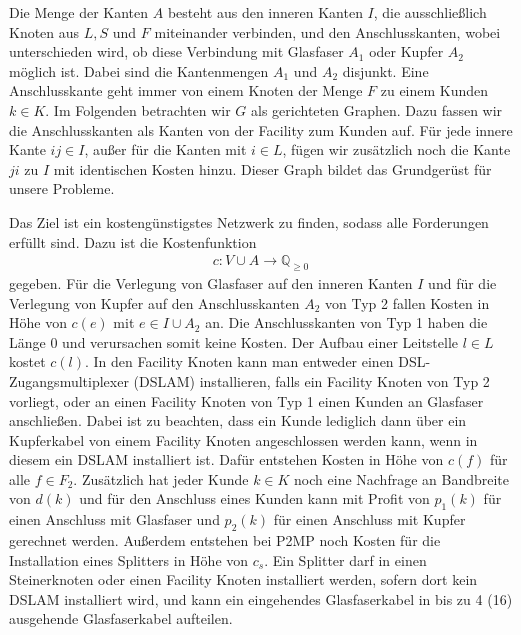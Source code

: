 \documentclass[11pt,a4paper]{article}
\newcommand{\Q}{\mathbb{Q}}
\theoremstyle{my_th_style1}
\begin{document}
Die Menge der Kanten $A$ besteht aus den inneren Kanten $I$, die ausschließlich Knoten aus \(L, S\) und \(F\) miteinander verbinden, und den Anschlusskanten, wobei unterschieden wird, ob diese Verbindung mit Glasfaser \(A_1\) oder Kupfer $A_2$ möglich ist.
Dabei sind die Kantenmengen $A_1$ und $A_2$ disjunkt.
Eine Anschlusskante geht immer von einem Knoten der Menge $F$ zu einem Kunden $k \in K$. 
Im Folgenden betrachten wir $G$ als gerichteten Graphen.
Dazu fassen wir die Anschlusskanten als Kanten von der Facility zum Kunden auf.
Für jede innere Kante $ij \in I$, außer für die Kanten mit $i \in L$, fügen wir zusätzlich noch die Kante $ji$ zu $I$ mit identischen Kosten hinzu.
Dieser Graph bildet das Grundgerüst für unsere Probleme.

Das Ziel ist ein kosteng\"unstigstes Netzwerk zu finden, sodass alle Forderungen erf\"ullt sind.
Dazu ist die Kostenfunktion 
\begin{align}
\label{Kostenfunktion}
c: V \cup A \rightarrow \Q_{\geq 0}
\end{align}
 gegeben.
Für die Verlegung von Glasfaser auf den inneren Kanten $I$ und f\"ur die Verlegung von Kupfer auf den Anschlusskanten \(A_2\) von Typ 2 fallen Kosten in Höhe von $c(e)$ mit $e \in I \cup A_2$ an.
Die  Anschlusskanten von Typ 1 haben die Länge 0 und verursachen somit keine Kosten.
Der Aufbau einer Leitstelle $ l\in L$ kostet $c(l)$. 
In den Facility Knoten kann man entweder einen DSL-Zugangsmultiplexer (DSLAM) installieren, falls ein Facility Knoten von Typ 2 vorliegt, oder an einen Facility Knoten von Typ 1 einen Kunden an Glasfaser anschließen.
Dabei ist zu beachten, dass ein Kunde lediglich dann \"uber ein Kupferkabel von einem Facility Knoten angeschlossen werden kann, wenn in diesem ein DSLAM installiert ist.
Dafür entstehen Kosten in Höhe von $c(f)$ für alle $f \in F_2$.
Zusätzlich hat jeder Kunde \(k \in K\) noch eine Nachfrage an Bandbreite von $d(k)$ und für den Anschluss eines Kunden kann mit Profit von $p_1(k)$ für einen Anschluss mit Glasfaser und $p_2(k)$ für einen Anschluss mit Kupfer gerechnet werden.
Außerdem entstehen bei P2MP noch Kosten für die Installation eines Splitters in H\"ohe von $c_s$.
Ein Splitter darf in einen Steinerknoten oder einen Facility Knoten installiert werden, sofern dort kein DSLAM installiert wird, und kann ein eingehendes Glasfaserkabel in bis zu 4 (16) ausgehende Glasfaserkabel aufteilen.
\end{document}
